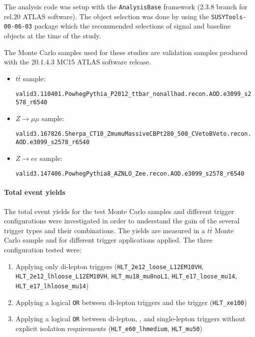 The analysis code was setup with the \texttt{AnalysisBase} framework (2.3.8 branch for rel.20 ATLAS software). 
The object selection was done by using the \texttt{SUSYTools-00-06-03} package 
which the recommended selections of signal and baseline objects at the time of the study. 

The Monte Carlo samples used for these studies are validation samples produced with the 20.1.4.3 MC15 ATLAS software release. 

\begin{itemize}

\item $t \bar{t}$ sample: 

\texttt{valid3.110401.PowhegPythia\_P2012\_ttbar\_nonallhad.recon.AOD.e3099\_s2578\_r6540}

\item $Z \rightarrow \mu \mu$ sample:  

\texttt{valid3.167826.Sherpa\_CT10\_ZmumuMassiveCBPt280\_500\_CVetoBVeto.recon.AOD.e3099\_s2578\_r6540}

\item $Z \rightarrow e e$ sample: 

\texttt{valid3.147406.PowhegPythia8\_AZNLO\_Zee.recon.AOD.e3099\_s2578\_r6540}

\end{itemize}

\paragraph{Total event yields}

The total event yields for the test Monte Carlo samples and different trigger configurations were investigated in order to understand the gain of the several trigger types and their combinations. The yields are measured in a $t \bar{t}$ Monte Carlo sample and for different trigger applications applied. The three configuration tested were:
\begin{enumerate}
\item Applying only di-lepton triggers ({\tt HLT\_2e12\_loose\_L12EM10VH}, {\tt HLT\_2e12\_lhloose\_L12EM10VH}, {\tt HLT\_mu18\_mu8noL1}, {\tt HLT\_e17\_loose\_mu14}, {\tt HLT\_e17\_lhloose\_mu14})
\item Applying a logical \texttt{OR} between di-lepton triggers and the \met trigger ({\tt HLT\_xe100})
\item Applying a logical \texttt{OR} between di-lepton, \met, and single-lepton triggers without explicit isolation requirements ({\tt HLT\_e60\_lhmedium}, {\tt HLT\_mu50})
\end{enumerate}

